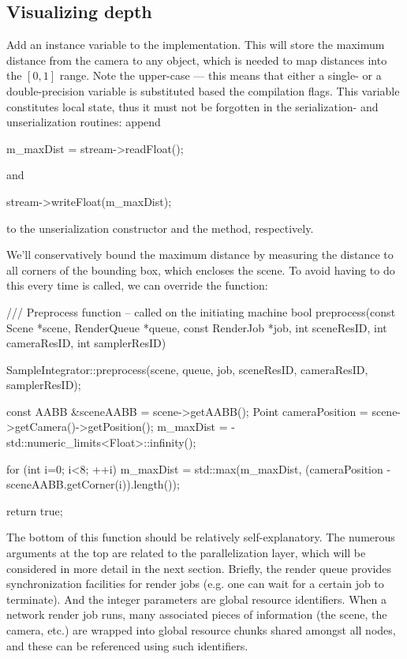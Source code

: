 \subsection{Visualizing depth}
Add an instance variable  to the implementation. This
will store the maximum distance from the camera to any object, which is needed
to map distances into the $[0,1]$ range. Note the upper-case  --- 
this means that either a single- or a double-precision variable is 
substituted based the compilation flags. This variable constitutes local
state, thus it must not be forgotten in the serialization- and unserialization routines:
append
\begin{cpp}
	m_maxDist = stream->readFloat();
\end{cpp}
and
\begin{cpp}
	stream->writeFloat(m_maxDist);
\end{cpp}
to the unserialization constructor and the  method, respectively.

We'll conservatively bound the maximum distance by measuring the
distance to all corners of the bounding box, which encloses the scene.
To avoid having to do this every time  is called,
we can override the  function:
\begin{cpp}
	/// Preprocess function -- called on the initiating machine
	bool preprocess(const Scene *scene, RenderQueue *queue, 
			const RenderJob *job, int sceneResID, int cameraResID, 
			int samplerResID) {
		SampleIntegrator::preprocess(scene, queue, job, sceneResID, 
			cameraResID, samplerResID);

		const AABB &sceneAABB = scene->getAABB();
		Point cameraPosition = scene->getCamera()->getPosition();
		m_maxDist = - std::numeric_limits<Float>::infinity();

		for (int i=0; i<8; ++i)
			m_maxDist = std::max(m_maxDist, 
				(cameraPosition - sceneAABB.getCorner(i)).length());

		return true;
	}
\end{cpp}
The bottom of this function should be relatively self-explanatory. The
numerous arguments at the top are related to the parallelization layer, which will be
considered in more detail in the next section. Briefly, the render queue
provides synchronization facilities for render jobs (e.g. one can wait
for a certain job to terminate). And the integer parameters are
global resource identifiers. When a network render job runs, many associated
pieces of information (the scene, the camera, etc.) are wrapped into global resource chunks
shared amongst all nodes, and these can be referenced using such identifiers.

